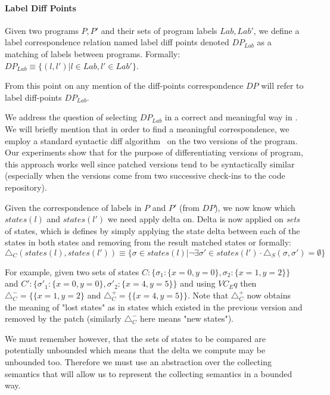 \paragraph{Label Diff Points} 
Given two programs $P,P'$ and their sets of program labels $Lab,Lab'$, we define a label correspondence relation named label diff points denoted $DP_{Lab}$ as a matching of labels between programs. Formally: $DP_{Lab} \equiv \{(l,l')|l \in Lab, l' \in Lab'\}$.

From this point on any mention of the diff-points correspondence $DP$ will refer to label diff-points $DP_{Lab}$.

We address the question of selecting $DP_{Lab}$ in a correct and meaningful way in . We will briefly mention that in order to find a meaningful correspondence, we employ a standard syntactic diff algorithm~\cite{Diff} on the two versions of the program. Our experiments show that for the purpose of differentiating versions of program, this approach works well since patched versions tend to be syntactically similar (especially when the versions come from two successive check-ins to the code repository).

Given the correspondence of labels in $P$ and $P'$ (from $DP$), we now know which $states(l)$ and $states(l')$ we need apply delta on. Delta is now applied on \emph{sets} of states, which is defines by simply applying the state delta  between each of the states in both states and removing from the result matched states or formally: $\triangle_{C}(states(l) ,states(l')) \equiv \{\sigma \in states(l)| \neg \exists \sigma' \in states(l') \cdot \triangle_{S}(\sigma, \sigma') = \emptyset\}$

For example, given two sets of states $C : \{\sigma_1:\{x=0,y=0\},\sigma_2:\{x=1,y=2\}\}$ and $C' : \{\sigma'_1:\{x=0,y=0\},\sigma'_2:\{x=4,y=5\}\}$ and using $VC_Eq$ then $\triangle_{C}^{-} = \{\{x=1,y=2\}$ and $\triangle_{C}^{+} = \{\{x=4,y=5\}\}$. Note that $\triangle_{C}^{+}$ now obtains the meaning of "lost states" as in states which existed in the previous version and removed by the patch (similarly $\triangle_{C}^{-}$ here means "new states").

We must remember however, that the sets of states to be compared are potentially unbounded which means that the delta we compute may be unbounded too. Therefore we must use an abstraction over the collecting semantics that will allow us to represent the collecting semantics in a bounded way.

